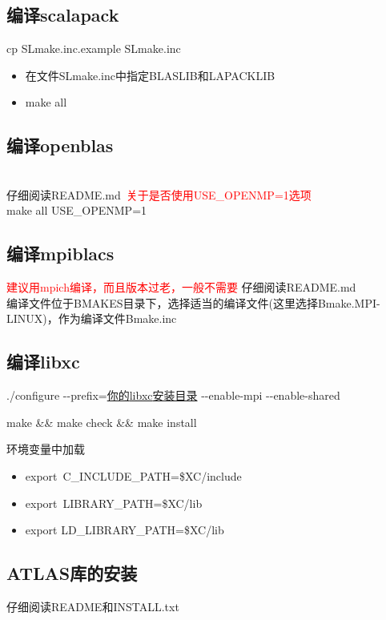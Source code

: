 \documentclass[10pt,a4paper]{article}
\begin{document}
\subsection{编译{\rm scalapack}}
\textrm{cp SLmake.inc.example SLmake.inc}
\begin{itemize}
	\item 在文件\textrm{SLmake.inc}中指定\textrm{BLASLIB}和\textrm{LAPACKLIB}
	\item \textrm{make all}
\end{itemize}

\subsection{编译{\rm openblas}}\\
仔细阅读\textrm{README.md}~\textcolor{red}{关于是否使用\textrm{USE_OPENMP=1}选项}\\
	\textrm{make all USE_OPENMP=1}

\subsection{编译{\rm mpiblacs}}
\textcolor{red}{建议用mpich编译，而且版本过老，一般不需要}
仔细阅读\textrm{README.md}%
\\编译文件位于\textrm{BMAKES}目录下，选择适当的编译文件(这里选择\textrm{Bmake.MPI-LINUX})，作为编译文件\textrm{Bmake.inc}

\subsection{编译{\rm libxc}}
./configure -\/-prefix=\underline{你的\textrm{libxc}安装目录} -\/-enable-mpi -\/-enable-shared

make \&\& make check \&\& make install

环境变量中加载 %
\begin{itemize}
	\item \textrm{export~C\_INCLUDE\_PATH=\$XC/include}
	\item \textrm{export~LIBRARY\_PATH=\$XC/lib}
	\item \textrm{export LD\_LIBRARY_PATH=\$XC/lib}
\end{itemize}

\subsection{{\rm ATLAS库的安装}}
仔细阅读\textrm{README}和\textrm{INSTALL.txt}\\
\end{document}
